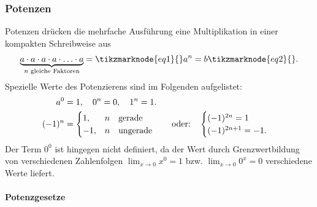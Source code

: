\subsubsection{Potenzen}
Potenzen drücken die mehrfache Ausführung eine Multiplikation in einer kompakten Schreibweise aus
\begin{align}
    \underbrace{a \cdot a \cdot a \cdot a \cdot \hdots \cdot a}_{n \text{ gleiche Faktoren}} = \tikzmarknode{eq1}{}a^n = b\tikzmarknode{eq2}{}.
\end{align}
Spezielle Werte des Potenzierens sind im Folgenden aufgelistet: 
\begin{align}
    a^0 &= 1, \quad 0^n = 0, \quad 1^n = 1. \\
    (-1)^n &= \begin{cases}
        1, & n \qq{gerade} \\
        -1, & n \qq{ungerade}
    \end{cases} \qq{oder:} \begin{cases}
        (-1)^{2n} = 1 \\
        (-1)^{2n+1} = -1.
    \end{cases}
\end{align}
Der Term $0^0$ ist hingegen nicht definiert, da der Wert durch Grenzwertbildung von verschiedenen Zahlenfolgen $\lim_{x\to 0} x^0 = 1$ bzw. $\lim_{x\to 0} 0^x = 0$ verschiedene Werte liefert. 

\paragraph{Potenzgesetze}$~$

